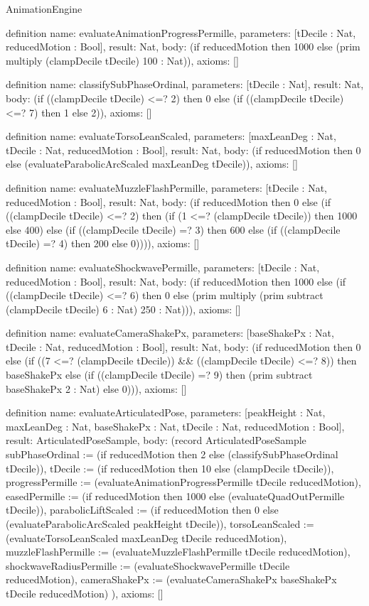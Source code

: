 \begin{lexlean}{AnimationEngine}
\begin{semanticmodule}
definition{
  name: evaluateAnimationProgressPermille,
  parameters: [tDecile : Nat, reducedMotion : Bool],
  result: Nat,
  body: (if reducedMotion then 1000 else (prim multiply (clampDecile tDecile) 100 : Nat)),
  axioms: []
}

definition{
  name: classifySubPhaseOrdinal,
  parameters: [tDecile : Nat],
  result: Nat,
  body: (if ((clampDecile tDecile) <=? 2) then 0 else (if ((clampDecile tDecile) <=? 7) then 1 else 2)),
  axioms: []
}

definition{
  name: evaluateTorsoLeanScaled,
  parameters: [maxLeanDeg : Nat, tDecile : Nat, reducedMotion : Bool],
  result: Nat,
  body: (if reducedMotion then 0 else (evaluateParabolicArcScaled maxLeanDeg tDecile)),
  axioms: []
}

definition{
  name: evaluateMuzzleFlashPermille,
  parameters: [tDecile : Nat, reducedMotion : Bool],
  result: Nat,
  body: (if reducedMotion then 0 else (if ((clampDecile tDecile) <=? 2) then (if (1 <=? (clampDecile tDecile)) then 1000 else 400) else (if ((clampDecile tDecile) =? 3) then 600 else (if ((clampDecile tDecile) =? 4) then 200 else 0)))),
  axioms: []
}

definition{
  name: evaluateShockwavePermille,
  parameters: [tDecile : Nat, reducedMotion : Bool],
  result: Nat,
  body: (if reducedMotion then 1000 else (if ((clampDecile tDecile) <=? 6) then 0 else (prim multiply (prim subtract (clampDecile tDecile) 6 : Nat) 250 : Nat))),
  axioms: []
}

definition{
  name: evaluateCameraShakePx,
  parameters: [baseShakePx : Nat, tDecile : Nat, reducedMotion : Bool],
  result: Nat,
  body: (if reducedMotion then 0 else (if ((7 <=? (clampDecile tDecile)) && ((clampDecile tDecile) <=? 8)) then baseShakePx else (if ((clampDecile tDecile) =? 9) then (prim subtract baseShakePx 2 : Nat) else 0))),
  axioms: []
}

definition{
  name: evaluateArticulatedPose,
  parameters: [peakHeight : Nat, maxLeanDeg : Nat, baseShakePx : Nat, tDecile : Nat, reducedMotion : Bool],
  result: ArticulatedPoseSample,
  body: (record ArticulatedPoseSample {
    subPhaseOrdinal := (if reducedMotion then 2 else (classifySubPhaseOrdinal tDecile)),
    tDecile := (if reducedMotion then 10 else (clampDecile tDecile)),
    progressPermille := (evaluateAnimationProgressPermille tDecile reducedMotion),
    easedPermille := (if reducedMotion then 1000 else (evaluateQuadOutPermille tDecile)),
    parabolicLiftScaled := (if reducedMotion then 0 else (evaluateParabolicArcScaled peakHeight tDecile)),
    torsoLeanScaled := (evaluateTorsoLeanScaled maxLeanDeg tDecile reducedMotion),
    muzzleFlashPermille := (evaluateMuzzleFlashPermille tDecile reducedMotion),
    shockwaveRadiusPermille := (evaluateShockwavePermille tDecile reducedMotion),
    cameraShakePx := (evaluateCameraShakePx baseShakePx tDecile reducedMotion)
  }),
  axioms: []
}


\end{semanticmodule}
\end{lexlean}
